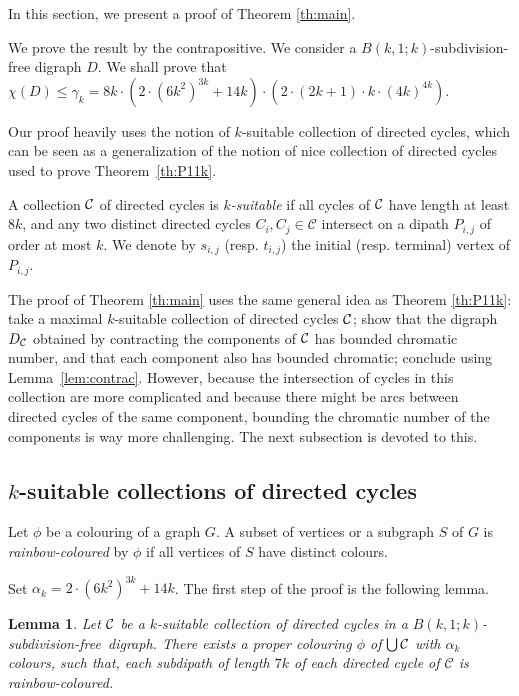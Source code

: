\documentclass[utf8,10pt]{article}
\theoremstyle{plain}
\newtheorem{lemma}[theorem]{Lemma}
\theoremstyle{definition}
\theoremstyle{remark}
\newcommand{\cste}{ 8k \cdot (2\cdot \col + 14k) \cdot (2 \cdot \dr)}
\newcommand{\dr}{ (2k+1)\cdot k \cdot (4k)^{4k}}
\newcommand{\col}{(6k^2)^{3k}}
\newcommand{\free}{subdivision-free}
\begin{document}
In this section, we present a proof of Theorem \ref{th:main}.

We prove the result by the contrapositive. We consider a $B(k,1;k)$-subdivision-free digraph $D$.
We shall prove that $\chi(D) \leq  \gamma_k= \cste$.




Our proof heavily uses the notion of $k$-suitable collection of directed cycles, which can be seen as a generalization of the notion of nice collection of directed cycles used to prove Theorem~\ref{th:P11k}.

 
 A collection ${\cal C}$ of directed cycles is {\it $k$-suitable} if all cycles of ${\cal C}$ have length at least $8k$, and
any two distinct directed cycles $C_i,C_j\in\mathcal C$ intersect on  a dipath $P_{i,j}$ of order at most $k$.
We denote by $s_{i,j}$ (resp. $t_{i,j}$) the initial (resp. terminal) vertex of  $P_{i,j}$. 

The proof of Theorem \ref{th:main} uses the same general idea as Theorem \ref{th:P11k}: take a maximal $k$-suitable collection of directed cycles ${\cal C}$; show that the digraph $D_{\cal C}$ obtained by contracting the components of ${\cal C}$ has bounded chromatic number, and that each component also has bounded chromatic; conclude using Lemma~\ref{lem:contrac}. However, because the intersection of cycles in this collection are more
complicated and because there might be arcs between directed cycles of the same component, bounding the chromatic number of the components is way more challenging. The next subsection is devoted to this.
 
 
 \subsection{$k$-suitable collections of directed cycles}

 Let $\phi$ be a colouring of a graph $G$. A subset of vertices or a subgraph $S$ of $G$ is {\it rainbow-coloured} by $\phi$ if all vertices of $S$ have distinct colours.

Set $\alpha_k=2\cdot \col + 14k$.
The first step of the proof is the following lemma.
 
 \begin{lemma}\label{lem:col-union-cycle}
Let ${\cal C}$ be a $k$-suitable collection of directed cycles in a $B(k,1;k)$-\free\ digraph.
There exists a proper colouring $\phi$ of $\bigcup{\cal C}$ with $\alpha_k$ colours, such that, each subdipath of length $7k$ of each directed cycle of $\mathcal{C}$ is rainbow-coloured.
\end{lemma}
 
\end{document}
